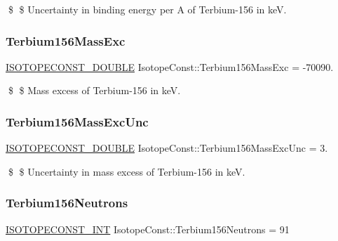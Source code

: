 \$ \$ Uncertainty in binding energy per A of Terbium-\/156 in keV. \mbox{\label{group___isotope_const-_terbium-_tb156_ga7b8914aef652934bdd0a82c524a5570f}} 
\subsubsection{\texorpdfstring{Terbium156\+Mass\+Exc}{Terbium156MassExc}}
{\footnotesize\ttfamily \mbox{\hyperlink{group___isotope_const-_macros_ga8f45a7272ce02c0b4c65c44636ed719a}{I\+S\+O\+T\+O\+P\+E\+C\+O\+N\+S\+T\+\_\+\+D\+O\+U\+B\+LE}} Isotope\+Const\+::\+Terbium156\+Mass\+Exc = -\/70090.}

\$ \$ Mass excess of Terbium-\/156 in keV. \mbox{\label{group___isotope_const-_terbium-_tb156_gacf90dfbdc43be08cdb0203caa0669d82}} 
\subsubsection{\texorpdfstring{Terbium156\+Mass\+Exc\+Unc}{Terbium156MassExcUnc}}
{\footnotesize\ttfamily \mbox{\hyperlink{group___isotope_const-_macros_ga8f45a7272ce02c0b4c65c44636ed719a}{I\+S\+O\+T\+O\+P\+E\+C\+O\+N\+S\+T\+\_\+\+D\+O\+U\+B\+LE}} Isotope\+Const\+::\+Terbium156\+Mass\+Exc\+Unc = 3.}

\$ \$ Uncertainty in mass excess of Terbium-\/156 in keV. \mbox{\label{group___isotope_const-_terbium-_tb156_ga9498d0738fd6ff096a8af3a5ac16e2da}} 
\subsubsection{\texorpdfstring{Terbium156\+Neutrons}{Terbium156Neutrons}}
{\footnotesize\ttfamily \mbox{\hyperlink{group___isotope_const-_macros_ga5f18360b3e99483a35c32d789e62621c}{I\+S\+O\+T\+O\+P\+E\+C\+O\+N\+S\+T\+\_\+\+I\+NT}} Isotope\+Const\+::\+Terbium156\+Neutrons = 91}

